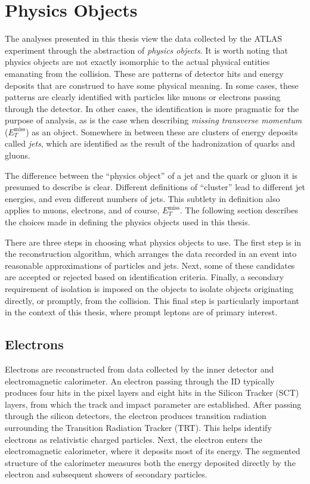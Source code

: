 \section{Physics Objects}\label{sec:physObjects}

The analyses presented in this thesis view the data collected by the ATLAS experiment through the abstraction of \emph{physics objects}.
It is worth noting that physics objects are not exactly isomorphic to the actual physical entities emanating from the collision.
These are patterns of detector hits and energy deposits that are construed to have some physical meaning.
In some cases, these patterns are clearly identified with particles like muons or electrons passing through the detector.
In other cases, the identification is more pragmatic for the purpose of analysis, as is the case when describing \emph{missing transverse momentum} ($E_T^\text{miss}$) as an object.
Somewhere in between these are clusters of energy deposits called \emph{jets}, which are identified as the result of the hadronization of quarks and gluons.

The difference between the ``physics object'' of a jet and the quark or gluon it is presumed to describe is clear.
Different definitions of ``cluster'' lead to different jet energies, and even different numbers of jets.
This subtlety in definition also applies to muons, electrons, and of course, $E_T^\text{miss}$.
The following section describes the choices made in defining the physics objects used in this thesis.

There are three steps in choosing what physics objects to use.
The first step is in the reconstruction algorithm, which arranges the data recorded in an event into reasonable approximations of particles and jets.
Next, some of these candidates are accepted or rejected based on identification criteria.
Finally, a secondary requirement of isolation is imposed on the objects to isolate objects originating directly, or promptly, from the collision.
This final step is particularly important in the context of this thesis, where prompt leptons are of primary interest.

\subsection{Electrons}
Electrons are reconstructed from data collected by the inner detector and electromagnetic calorimeter.
An electron passing through the ID typically produces four hits in the pixel layers and eight hits in the Silicon Tracker (SCT) layers, from which the track and impact parameter are established.
After passing through the silicon detectors, the electron produces transition radiation surrounding the Transition Radiation Tracker (TRT).
This helps identify electrons as relativistic charged particles.
Next, the electron enters the electromagnetic calorimeter, where it deposits most of its energy.
The segmented structure of the calorimeter measures both the energy deposited directly by the electron and subsequent showers of secondary particles.

